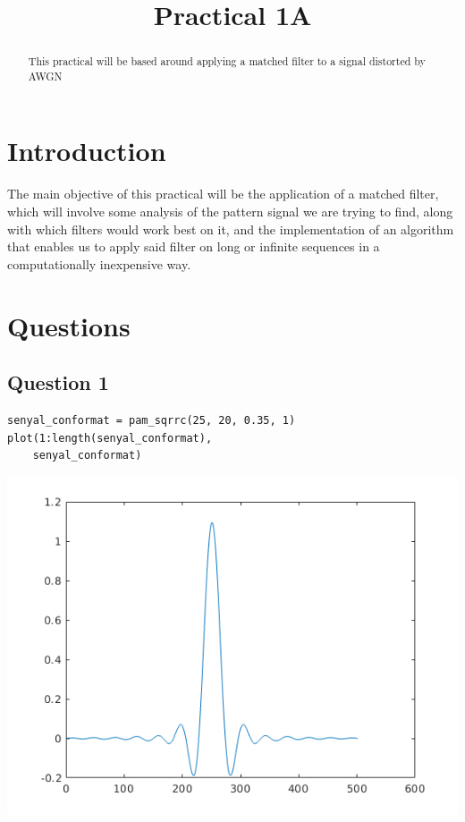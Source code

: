 \documentclass[conference,9pt]{IEEEtran}
\begin{document}
%
\title{Practical 1A}

\author{
}


\maketitle
\begin{abstract}
This practical will be based around applying a matched filter to a signal distorted by AWGN\end{abstract}



\section{Introduction}
The main objective of this practical will be the application of a matched filter, which will involve some analysis of the pattern signal we are trying to find, along with which filters would work best on it, and the implementation of an algorithm that enables us to apply said filter on long or infinite sequences in a computationally inexpensive way.

\section{Questions}
\subsection{Question 1}
\begin{verbatim}
senyal_conformat = pam_sqrrc(25, 20, 0.35, 1)
plot(1:length(senyal_conformat),
    senyal_conformat)
\end{verbatim}
\includegraphics[scale=0.6]{pulso1}
\end{document}
